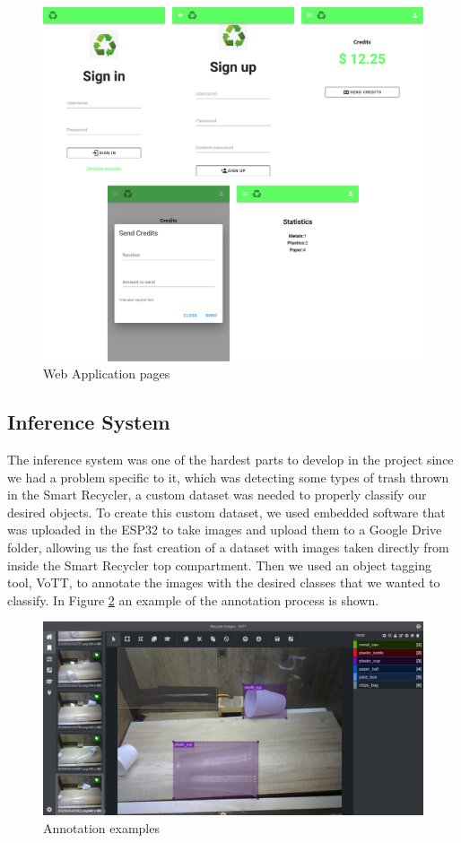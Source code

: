 \documentclass[a4paper,11pt]{article}
\begin{document}
\begin{figure}[H]
  \centering
  \includegraphics[scale=0.1]{Figures/front_pages.png}
  \caption{\small{Web Application pages}}
  \label{fig:front_pages}
\end{figure}

\subsection{Inference System}
The inference system was one of the hardest parts to develop in the project since we had a problem specific to it, which was detecting some types of trash thrown in the Smart Recycler, a custom dataset was needed to properly classify our desired objects. To create this custom dataset, we used embedded software that was uploaded in the ESP32 to take images and upload them to a Google Drive folder, allowing us the fast creation of a dataset with images taken directly from inside the Smart Recycler top compartment. Then we used an object tagging tool, VoTT, to annotate the images with the desired classes that we wanted to classify. In Figure \ref{fig:annotation_example} an example of the annotation process is shown.

\begin{figure}[H]
  \centering
  \includegraphics[width=12.5cm]{Figures/annotation_example.png}
  \caption{\small{Annotation examples}}
  \label{fig:annotation_example}
\end{figure}
\end{document}
